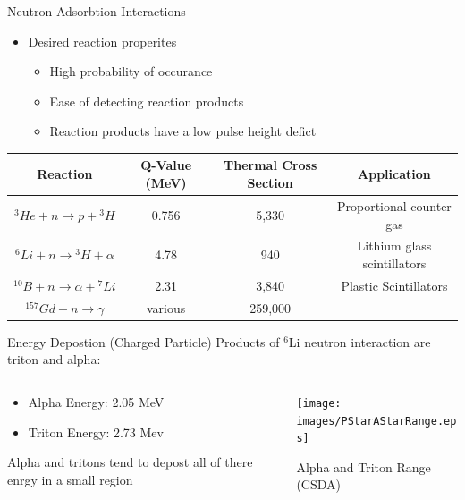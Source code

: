 \documentclass{beamer}
\begin{document}
\begin{frame}{Neutron Adsorbtion Interactions}
\begin{itemize}
	\item Desired reaction properites
	\begin{itemize}
		\item High probability of occurance
		\item Ease of detecting reaction products
		\item Reaction products have a low pulse height defict
	\end{itemize}
	\end{itemize}
	\begin{table}[h]
	\tiny
	\centering
	\begin{tabular}{c| c c c} 
		Reaction & Q-Value (MeV) & Thermal Cross Section & Application \\
		\hline
		\hline
		${}^3He + n \to p +{}^3H$ & 0.756 & 5,330 & Proportional counter gas \\
		${}^6Li + n \to {}^3H + \alpha$ & 4.78 & 940 & Lithium glass scintillators \\
		${}^{10}B + n \to \alpha + {}^7Li$ & 2.31 & 3,840 & Plastic Scintillators \\
		${}^{157}Gd + n \to \gamma$  &various &259,000 \\
	\end{tabular}
	\end{table}
\end{frame}

\begin{frame}{Energy Depostion (Charged Particle)}
Products of ${}^6$Li neutron interaction are triton and alpha:
\begin{columns}[onlytextwidth]
\begin{column}{0.45\textwidth}
\begin{itemize}
	\small
	\item Alpha Energy: 2.05 MeV
	\item Triton Energy: 2.73 Mev
\end{itemize}
Alpha and tritons tend to depost all of there enrgy in a small region
\end{column}
\begin{column}{0.45\textwidth}
	\texttt{[image: images/PStarAStarRange.eps]}
	\caption{Alpha and Triton Range (CSDA) \protect \cite{berger_estar_2005}}
	\label{fig:PStarAStarRange}
\end{column}
\end{columns}
\end{frame}
\end{document}
